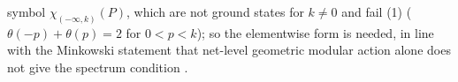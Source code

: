 symbol $\chi_{(-\infty, k)}(P)$, which are not ground states for $k \ne 0$ and fail (1) ($\theta(-p) + \theta(p) = 2$ for $0 < p < k$); so the elementwise form is needed, in line with the Minkowski statement that net-level geometric modular action alone does not give the spectrum condition \cite{BFS1999}.
